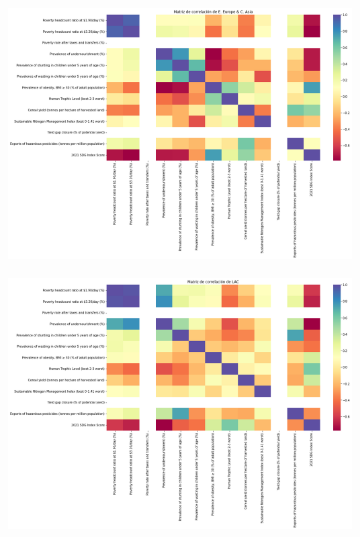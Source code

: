 \documentclass[a4paper,12pt]{amsart}
\begin{document}
\begin{figure}[!h]
\begin{subfigure}{0.49\textwidth}
            \includegraphics[width=\linewidth]{Images/Corr_europe.png}
        \end{subfigure}
        \begin{subfigure}{0.49\textwidth}
            \includegraphics[width=\linewidth]{Images/Corr_LAC.png}
        \end{subfigure}
        

\end{figure}
\end{document}
